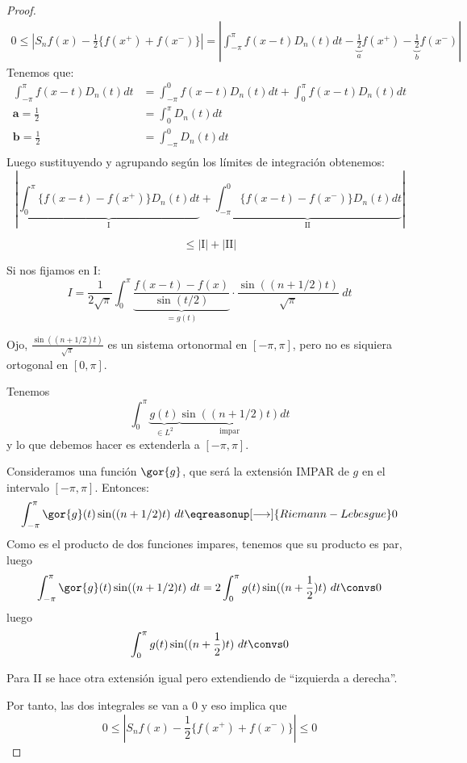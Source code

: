 	\begin{proof}
		\begin{gather*}
			0 \leq | S_n f(x) - \frac{1}{2} \{f(x^+) + f(x^-)\} | = \left| \int_{-\pi}^\pi f(x-t) D_n (t) dt - \underbrace{\frac{1}{2}}_{a} f(x^+)- \underbrace{\frac{1}{2}}_{b} f(x^-) \right|
		\end{gather*}
		Tenemos que:
		\begin{align*}
			\int_{-\pi}^\pi f(x-t) D_n (t) dt &= \int_{-\pi}^{0} f(x-t) D_n(t)dt + \int_{0}^\pi f(x-t) D_n(t) dt\\
			\textbf{a} = \frac{1}{2} &= \int_0^\pi D_n (t) dt \\
			\textbf{b} = \frac{1}{2} &= \int_{-\pi}^0 D_n (t) dt \\
		\end{align*}
		Luego sustituyendo y agrupando según los límites de integración obtenemos:
		\[ \left| \underbrace{\int_0^\pi  \{ f(x-t) - f(x^+) \} D_n(t) dt }_{\text{I}} + \underbrace{\int_{-\pi}^{0}  \{ f(x-t) - f(x^-) \} D_n(t) dt }_{\text{II}} \right| \]

		\[\leq | \text{I} | +  |\text{II}| \]

		Si nos fijamos en I:
		\[ I = \frac{1}{2\sqrt{\pi}} \int_{0}^\pi \underbrace{\frac{f(x-t)-f(x)}{\sin(t/2)}}_{=g(t)} \cdot \frac{\sin((n+1/2)t)}{\sqrt{\pi}} \ dt \]

		Ojo, $\frac{\sin((n+1/2)t)}{\sqrt{\pi}}$ es un sistema ortonormal en $[-\pi,\pi]$, pero no es siquiera ortogonal en $[0,\pi]$.

		Tenemos
		\[ \int_{0}^\pi \underbrace{g(t)}_{\in L^2} \underbrace{\sin((n+1/2)t)}_{\text{impar}} dt \]
		y lo que debemos hacer es extenderla a $[-\pi,\pi]$.

		Consideramos una función $\gor{g}$, que será la extensión IMPAR de $g$ en el intervalo $[-\pi,\pi]$. Entonces:
		\[ \int_{-\pi}^\pi  \gor{g}(t) \sin((n+1/2)t) \ dt \eqreasonup[\longrightarrow]{Riemann-Lebesgue} 0 \]
		Como es el producto de dos funciones impares, tenemos que su producto es par, luego
		\[ \int_{-\pi}^\pi  \gor{g}(t) \sin((n+1/2)t) \ dt = 2 \int_{0}^\pi g(t) \sin((n + \frac{1}{2})t)\ dt \convs 0 \]
		luego
		\[ \int_{0}^\pi g(t) \sin((n + \frac{1}{2})t)\ dt \convs 0 \]

		\noindent Para II se hace otra extensión igual pero extendiendo de ``izquierda a derecha''.

		\noindent Por tanto, las dos integrales se van a 0 y eso implica que $$0 \leq | S_n f(x) - \frac{1}{2} \{f(x^+) + f(x^-)\} | \leq 0$$
	\end{proof}

